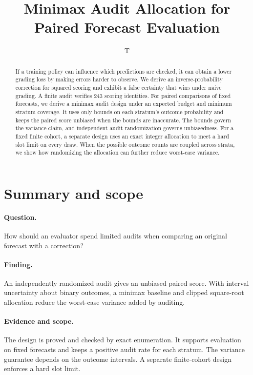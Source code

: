 \documentclass[11pt]{article}
\title{Minimax Audit Allocation for Paired Forecast Evaluation}
\author{T}
\date{}
\begin{document}
\maketitle

\begin{abstract}
If a training policy can influence which predictions are checked, it
can obtain a lower grading loss by making errors harder to observe.
We derive an inverse-probability correction for squared scoring and
exhibit a false certainty that wins under naive grading. A finite
audit verifies 243 scoring identities. For paired comparisons of
fixed forecasts, we derive a minimax audit design under an expected
budget and minimum stratum coverage. It uses only bounds on each
stratum's outcome probability and keeps the paired score unbiased
when the bounds are inaccurate. The bounds govern the variance
claim, and independent audit randomization governs unbiasedness.
For a fixed finite cohort, a separate design uses an exact integer
allocation to meet a hard slot limit on every draw. When the
possible outcome counts are coupled across strata, we show how
randomizing the allocation can further reduce worst-case variance.
\end{abstract}

\section*{Summary and scope}
\paragraph{Question.} How should an evaluator spend limited audits when
comparing an original forecast with a correction?
\paragraph{Finding.} An independently randomized audit gives an unbiased
paired score. With interval uncertainty about binary outcomes, a minimax
baseline and clipped square-root allocation reduce the worst-case
variance added by auditing.
\paragraph{Evidence and scope.} The design is proved and checked
by exact enumeration. It supports evaluation on fixed forecasts and keeps
a positive audit rate for each stratum. The variance guarantee depends
on the outcome intervals. A separate finite-cohort design enforces a hard
slot limit.
\end{document}
